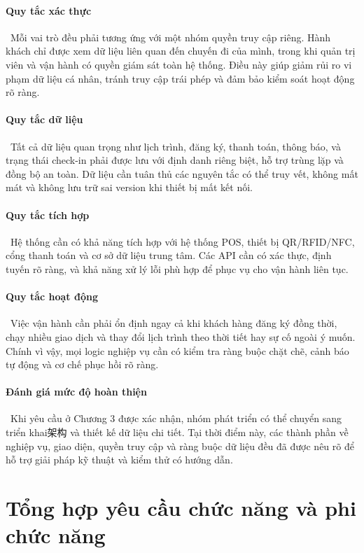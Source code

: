 \paragraph{Quy tắc xác thực}\
Mỗi vai trò đều phải tương ứng với một nhóm quyền truy cập riêng. Hành khách chỉ được xem dữ liệu liên quan đến chuyến đi của mình, trong khi quản trị viên và vận hành có quyền giám sát toàn hệ thống. Điều này giúp giảm rủi ro vi phạm dữ liệu cá nhân, tránh truy cập trái phép và đảm bảo kiểm soát hoạt động rõ ràng.

\paragraph{Quy tắc dữ liệu}\
Tất cả dữ liệu quan trọng như lịch trình, đăng ký, thanh toán, thông báo, và trạng thái check-in phải được lưu với định danh riêng biệt, hỗ trợ trùng lặp và đồng bộ an toàn. Dữ liệu cần tuân thủ các nguyên tắc có thể truy vết, không mất mát và không lưu trữ sai version khi thiết bị mất kết nối.

\paragraph{Quy tắc tích hợp}\
Hệ thống cần có khả năng tích hợp với hệ thống POS, thiết bị QR/RFID/NFC, cổng thanh toán và cơ sở dữ liệu trung tâm. Các API cần có xác thực, định tuyến rõ ràng, và khả năng xử lý lỗi phù hợp để phục vụ cho vận hành liên tục.

\paragraph{Quy tắc hoạt động}\
Việc vận hành cần phải ổn định ngay cả khi khách hàng đăng ký đồng thời, chạy nhiều giao dịch và thay đổi lịch trình theo thời tiết hay sự cố ngoài ý muốn. Chính vì vậy, mọi logic nghiệp vụ cần có kiểm tra ràng buộc chặt chẽ, cảnh báo tự động và cơ chế phục hồi rõ ràng.

\paragraph{Đánh giá mức độ hoàn thiện}\
Khi yêu cầu ở Chương 3 được xác nhận, nhóm phát triển có thể chuyển sang triển khai架构 và thiết kế dữ liệu chi tiết. Tại thời điểm này, các thành phần về nghiệp vụ, giao diện, quyền truy cập và ràng buộc dữ liệu đều đã được nêu rõ để hỗ trợ giải pháp kỹ thuật và kiểm thử có hướng dẫn.

\section{Tổng hợp yêu cầu chức năng và phi chức năng}

